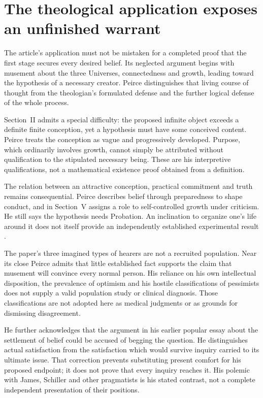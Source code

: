 \section{The theological application exposes an unfinished warrant}
\label{sec:p16-peirce-theological-boundary}

The article's application must not be mistaken for a completed proof
that the first stage secures every desired belief. Its neglected argument
begins with musement about the three Universes, connectedness and growth,
leading toward the hypothesis of a necessary creator. Peirce distinguishes
that living course of thought from the theologian's formulated defense
and the further logical defense of the whole process.

Section~II admits a special difficulty: the proposed infinite object
exceeds a definite finite conception, yet a hypothesis must have some
conceived content. Peirce treats the conception as vague and progressively
developed. Purpose, which ordinarily involves growth, cannot simply be
attributed without qualification to the stipulated necessary being.
These are his interpretive qualifications, not a mathematical existence
proof obtained from a definition.

The relation between an attractive conception, practical commitment and
truth remains consequential. Peirce describes belief through preparedness
to shape conduct, and in Section~V assigns a role to self-controlled
growth under criticism. He still says the hypothesis needs Probation.
An inclination to organize one's life around it does not itself provide
an independently established experimental result
\parencite[secs.~II, V]{Peirce1908NeglectedPrimary}.

The paper's three imagined types of hearers are not a recruited population.
Near its close Peirce admits that little established fact supports the
claim that musement will convince every normal person. His reliance on
his own intellectual disposition, the prevalence of optimism and his
hostile classifications of pessimists does not supply a valid population
study or clinical diagnosis. Those classifications are not adopted here
as medical judgments or as grounds for dismissing disagreement.

He further acknowledges that the argument in his earlier popular essay
about the settlement of belief could be accused of begging the question.
He distinguishes actual satisfaction from the satisfaction which would
survive inquiry carried to its ultimate issue. That correction prevents
substituting present comfort for his proposed endpoint; it does not
prove that every inquiry reaches it. His polemic with James, Schiller
and other pragmatists is his stated contrast, not a complete independent
presentation of their positions.


